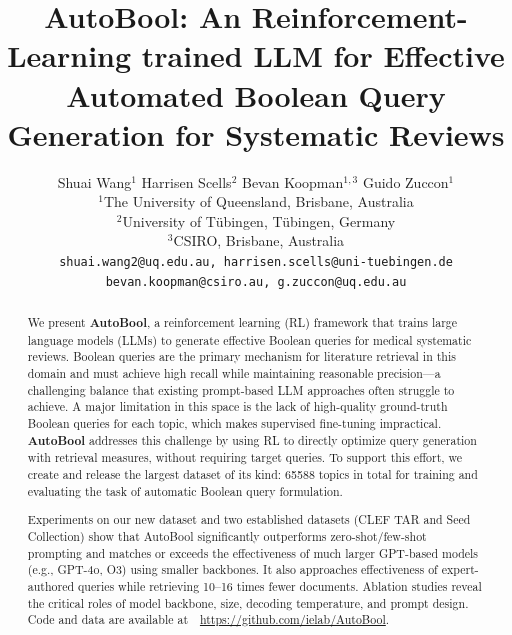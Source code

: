 \documentclass[12pt]{article}
\title{\bfseries AutoBool: An Reinforcement-Learning trained LLM for Effective Automated Boolean Query Generation for Systematic Reviews}
\author{
	Shuai Wang$^{1}$ \quad
	Harrisen Scells$^{2}$ \quad
	Bevan Koopman$^{1,3}$ \quad
	Guido Zuccon$^{1}$ \\
	\normalsize $^1$The University of Queensland, Brisbane, Australia \\
	\normalsize $^2$University of Tübingen, Tübingen, Germany \\
	\normalsize $^3$CSIRO, Brisbane, Australia \\
	\normalsize \texttt{shuai.wang2@uq.edu.au, harrisen.scells@uni-tuebingen.de} \\
	\normalsize \texttt{bevan.koopman@csiro.au, g.zuccon@uq.edu.au}
}
\date{}
\begin{document}
	\maketitle
	
	\begin{abstract}
	We present \textbf{AutoBool}, a reinforcement learning (RL) framework that trains large language models (LLMs) to generate effective Boolean queries for medical systematic reviews. Boolean queries are the primary mechanism for literature retrieval in this domain and must achieve high recall while maintaining reasonable precision---a challenging balance that existing prompt-based LLM approaches often struggle to achieve.
	A major limitation in this space is the lack of high-quality ground-truth Boolean queries for each topic, which makes supervised fine-tuning impractical. \textbf{AutoBool} addresses this challenge by using RL to directly optimize query generation with retrieval  measures, without requiring target queries.
	To support this effort, we create and release the largest dataset of its kind: \num{65 588} topics in total for training and evaluating the task of automatic Boolean query formulation.
	
	Experiments on our new dataset and two established datasets (CLEF TAR and Seed Collection) show that AutoBool significantly outperforms zero-shot/few-shot prompting and matches or exceeds the effectiveness of much larger GPT-based models (e.g., GPT-4o, O3) using smaller backbones. It also approaches effectiveness of expert-authored queries while retrieving 10–16 times fewer documents. Ablation studies reveal the critical roles of model backbone, size, decoding temperature, and prompt design. Code and data are available at~~\url{https://github.com/ielab/AutoBool}.
	\end{abstract}
	
	
	
	
	
	
	
	
	
	
	\appendix
	
	
	
	
\end{document}
